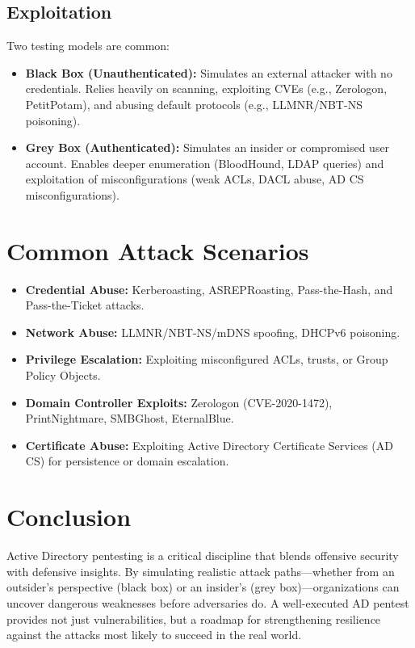 \subsection{Exploitation}
Two testing models are common:
\begin{itemize}
  \item \textbf{Black Box (Unauthenticated):} Simulates an external attacker with no credentials. Relies heavily on scanning, exploiting CVEs (e.g., Zerologon, PetitPotam), and abusing default protocols (e.g., LLMNR/NBT-NS poisoning).
  \item \textbf{Grey Box (Authenticated):} Simulates an insider or compromised user account. Enables deeper enumeration (BloodHound, LDAP queries) and exploitation of misconfigurations (weak ACLs, DACL abuse, AD CS misconfigurations).
\end{itemize}

\section{Common Attack Scenarios}
\begin{itemize}
  \item \textbf{Credential Abuse:} Kerberoasting, ASREPRoasting, Pass-the-Hash, and Pass-the-Ticket attacks.
  \item \textbf{Network Abuse:} LLMNR/NBT-NS/mDNS spoofing, DHCPv6 poisoning.
  \item \textbf{Privilege Escalation:} Exploiting misconfigured ACLs, trusts, or Group Policy Objects.
  \item \textbf{Domain Controller Exploits:} Zerologon (CVE-2020-1472), PrintNightmare, SMBGhost, EternalBlue.
  \item \textbf{Certificate Abuse:} Exploiting Active Directory Certificate Services (AD CS) for persistence or domain escalation.
\end{itemize}

\section{Conclusion}
Active Directory pentesting is a critical discipline that blends offensive security with defensive insights. By simulating realistic attack paths—whether from an outsider’s perspective (black box) or an insider’s (grey box)—organizations can uncover dangerous weaknesses before adversaries do. A well-executed AD pentest provides not just vulnerabilities, but a roadmap for strengthening resilience against the attacks most likely to succeed in the real world.
